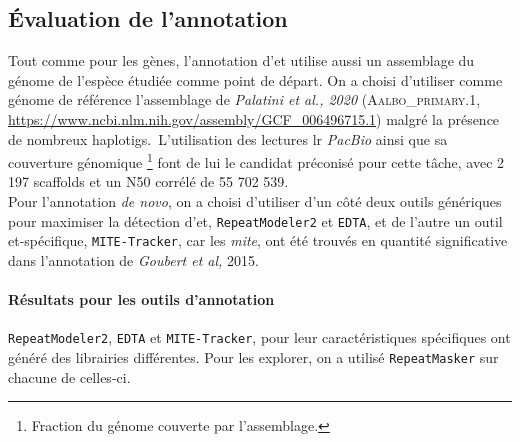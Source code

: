 \documentclass[10pt]{article}
\begin{document}
\subsection{\'Evaluation de l'annotation} 

Tout comme pour les gènes, l'annotation d'\acrlong{et} utilise aussi un assemblage du génome de l'espèce étudiée comme point de départ. On a choisi d'utiliser comme génome de référence l'assemblage de \textit{Palatini et al., 2020} (\textsc{Aalbo\_primary.1}, \url{https://www.ncbi.nlm.nih.gov/assembly/GCF_006496715.1}) malgré la présence de nombreux haplotigs. L'utilisation des lectures \acrlong{lr} \textit{PacBio} ainsi que sa couverture génomique \footnote{Fraction du génome couverte par l'assemblage.} font de lui le candidat préconisé pour cette tâche, avec 2 197 scaffolds et un N50 corrélé de 55 702 539. \\ 

Pour l'annotation \textit{de novo}, on a choisi d'utiliser d'un côté deux outils génériques pour maximiser la détection d'\acrshort{et}, \texttt{RepeatModeler2} et \texttt{EDTA}, et de l'autre un outil \acrshort{et}-spécifique, \texttt{MITE-Tracker}, car les \textit{\acrshort{mite}}, ont été trouvés en quantité significative dans l'annotation de \textit{Goubert et al,} 2015.

\paragraph{Résultats pour les outils d'annotation} \texttt{RepeatModeler2}, \texttt{EDTA} et \texttt{MITE-Tracker}, pour leur caractéristiques spécifiques ont généré des librairies différentes. Pour les explorer, on a utilisé \texttt{RepeatMasker} sur chacune de celles-ci.

\bigskip
\end{document}
